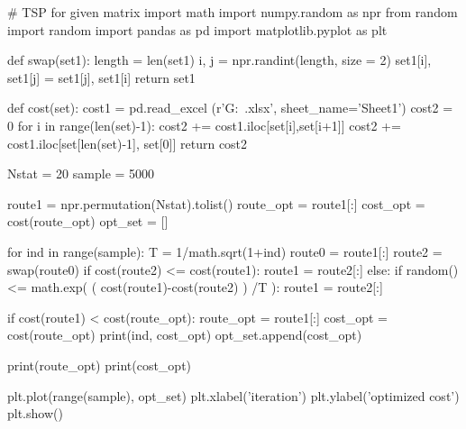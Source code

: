 \begin{python}
# TSP for given matrix
import math
import numpy.random as npr
from random import random
import pandas as pd
import matplotlib.pyplot as plt


def swap(set1):
    length = len(set1)
    i, j = npr.randint(length, size = 2)
    set1[i], set1[j] = set1[j], set1[i]
    return set1

def cost(set):
    cost1 = pd.read_excel (r'G:\dtumaster\stochasticSimulation\
                           \code\cost.xlsx', sheet_name='Sheet1')
    cost2 = 0
    for i in range(len(set)-1):
        cost2 += cost1.iloc[set[i],set[i+1]]
    cost2 += cost1.iloc[set[len(set)-1], set[0]]
    return cost2


Nstat = 20
sample = 5000


route1 = npr.permutation(Nstat).tolist()
route_opt = route1[:]
cost_opt = cost(route_opt)
opt_set = []

for ind in range(sample):
    T = 1/math.sqrt(1+ind)
    route0 = route1[:]
    route2 = swap(route0)
    if cost(route2) <= cost(route1):
        route1 = route2[:]
    else:
        if random() <= math.exp( ( cost(route1)-cost(route2) ) /T ):
            route1 = route2[:] 
    
    if cost(route1) < cost(route_opt):
        route_opt = route1[:]
        cost_opt = cost(route_opt)
    print(ind, cost_opt)
    opt_set.append(cost_opt)
    
print(route_opt)
print(cost_opt)

plt.plot(range(sample), opt_set)
plt.xlabel('iteration')
plt.ylabel('optimized cost')
plt.show()

\end{python}




